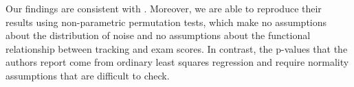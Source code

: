 \documentclass[11pt]{article}
\begin{document}
Our findings are consistent with \cite{duflo2011}. Moreover, we are able to reproduce their results using non-parametric permutation tests, which make no assumptions about the distribution of noise and no assumptions about the functional relationship between tracking and exam scores. In contrast, the p-values that the authors report come from ordinary least squares regression and require normality assumptions that are difficult to check.



 
\end{document}
